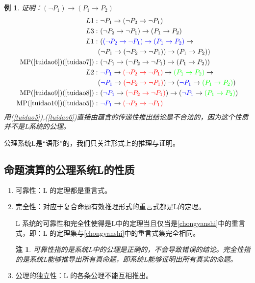 \documentclass[12pt,onecolumn,a4paper]{book}
\newtheorem*{example}{例}
\newtheorem*{note}{注}
\numberwithin{table}{subsection}
\numberwithin{equation}{subsection}
\begin{document}
\begin{example}证明：$(\neg P_1) \rightarrow (P_1 \rightarrow P_2)$
    \begin{align}
        L1: & \ \neg P_1 \rightarrow (\neg P_2 \rightarrow \neg P_1) \label{tuidao5} \\
        L3: & \ (\neg P_2 \rightarrow \neg P_1) \rightarrow (P_1 \rightarrow P_2) \label{tuidao6} \\
        L1: & \ (\textcolor{blue}{(\neg P_2 \rightarrow \neg P_1) \rightarrow (P_1 \rightarrow P_2)} \rightarrow \notag \\
        & (\neg P_1 \rightarrow (\neg P_2 \rightarrow \neg P_1)) \rightarrow (P_1 \rightarrow P_2)) \label{tuidao7}\\
        \text{MP}(\ref{tuidao6})(\ref{tuidao7}): & \ (\neg P_1 \rightarrow (\neg P_2 \rightarrow \neg P_1) \rightarrow (P_1 \rightarrow P_2)) \label{tuidao8}\\
        L2: & \ \textcolor{blue}{\neg P_1} \rightarrow \textcolor{red}{(\neg P_2 \rightarrow \neg P_1)} \rightarrow \textcolor{green}{(P_1 \rightarrow P_2)} \rightarrow \notag \\
        & (\textcolor{blue}{\neg P_1} \rightarrow \textcolor{red}{(\neg P_2 \rightarrow \neg P_1)}) \rightarrow (\textcolor{blue}{\neg P_1} \rightarrow \textcolor{green}{(P_1 \rightarrow P_2)}) \label{tuidao9}\\
        \text{MP}(\ref{tuidao9})(\ref{tuidao8}): & \ (\textcolor{blue}{\neg P_1} \rightarrow \textcolor{red}{(\neg P_2 \rightarrow \neg P_1)}) \rightarrow (\textcolor{blue}{\neg P_1} \rightarrow \textcolor{green}{(P_1 \rightarrow P_2)}) \label{tuidao10}\\
        \text{MP}(\ref{tuidao10})(\ref{tuidao5}): & \ \textcolor{blue}{\neg P_1} \rightarrow \textcolor{red}{(\neg P_2 \rightarrow \neg P_1)} \label{tuidao11}
    \end{align}
    用(\ref{tuidao5}),(\ref{tuidao6})直接由蕴含的传递性推出结论是不合法的，因为这个性质并不是L系统的公理。
\end{example}

公理系统L是“语形”的，我们只关注形式上的推理与证明。

\subsection{命题演算的公理系统L的性质}

\begin{enumerate}
    \item 可靠性：L 的定理都是重言式。
    \item 完全性：对应于复合命题有效推理形式的重言式都是L的定理。

    L 系统的可靠性和完全性使得是L中的定理当且仅当是\ref{chongyanshi}中的重言式，即：L 的定理集与\ref{chongyanshi}中的重言式集完全相同。

    \begin{note}
        可靠性指的是系统L中的公理是正确的，不会导致错误的结论。完全性指的是系统L能够推导出所有真命题，即系统L能够证明出所有真实的命题。
    \end{note}
    \item 公理的独立性：L 的各条公理不能互相推出。
\end{enumerate}
\end{document}
